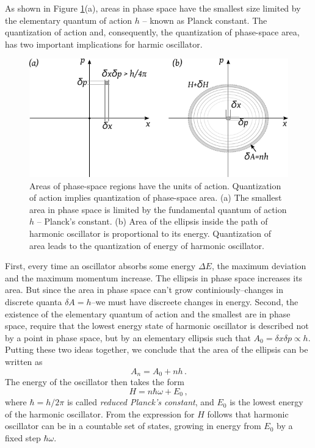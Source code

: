 As shown in Figure \ref{fig:phaseSpaceQuantum}(a), areas in phase space have the smallest size limited by the elementary quantum of action $h$ -- known as Planck constant. The quantization of action and, consequently, the quantization of phase-space area, has two important implications for harmic oscillator.
\begin{figure}[htbp]
	\centering
	\includegraphics[scale=1.0]{phaseSpaceQuantum}
	\caption{Areas of phase-space regions have the units of action. Quantization of action implies quantization of phase-space area. (a) The smallest area in phase space is limited by the fundamental quantum of action $h$ -- Planck's constant. (b) Area of the ellipsis inside the path of harmonic oscillator is proportional to its energy. Quantization of area leads to the quantization of energy of harmonic oscillator.}
	\label{fig:phaseSpaceQuantum}
\end{figure}

First, every time an oscillator absorbs some energy $\Delta E$, the maximum deviation and the maximum momentum increase. The ellipsis in phase space increases its area. But since the area in phase space can't grow continiously--changes in discrete quanta $\delta A=h$--we must have discreete changes in energy. Second, the existence of the elementary quantum of action and the smallest are in phase space, require that the lowest energy state of harmonic oscillator is described not by a point in phase space, but by an elementary ellipsis such that $A_0=\delta x\delta p\propto h$. Putting these two ideas together, we conclude that the area of the ellipsis can be written as
\[
A_n = A_0 + nh\,.
\]
The energy of the oscillator then takes the form
\[
H=n\hbar\omega + E_0\,,
\]
where $\hbar=h/2\pi$ is called \emph{reduced Planck's constant}, and $E_0$ is the lowest energy of the harmonic oscillator. From the expression for $H$ follows that harmonic oscillator can be in a countable set of states, growing in energy from $E_0$ by a fixed step $\hbar\omega$. 

